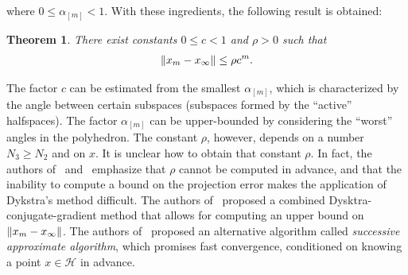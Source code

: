\documentclass[hidelinks]{article}
\newtheorem{theorem}{Theorem}
\begin{document}
where $0\leq\alpha_{[m]}<1$. With these ingredients, the following result is obtained:
\begin{theorem}
There exist constants $0\leq c < 1$ and $\rho > 0$ such that
\begin{align*}
\Vert x_m -x_\infty \Vert \leq \rho c^m.
\end{align*}
\end{theorem}
The factor $c$ can be estimated from the smallest $\alpha_{[m]}$, which is characterized by the angle between certain subspaces (subspaces formed by the ``active'' halfspaces). The factor $\alpha_{[m]}$ can be upper-bounded by considering the ``worst'' angles in the polyhedron.
%
The constant $\rho$, however, depends on a number $N_3\geq N_2$ and on $x$. It is unclear how to obtain that constant $\rho$. In fact, the authors of~\cite{DYKSTRAPERKINS} and~\cite{XUPOLY} emphasize that $\rho$ cannot be computed in advance, and that the inability to compute a bound on the projection error makes the application of Dykstra's method difficult. The authors of~\cite{DYKSTRAPERKINS} proposed a combined Dysktra-conjugate-gradient method that allows for computing an upper bound on $\Vert x_m -x_\infty \Vert$. The authors of~\cite{XUPOLY} proposed an alternative algorithm called \emph{successive approximate algorithm}, which promises fast convergence, conditioned on knowing a point $x\in\mathcal{H}$ in advance. \label{sec: dykstra}
%
\end{document}
